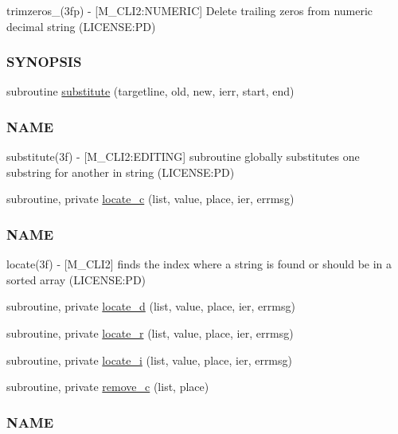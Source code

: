 \begin{DoxyCompactItemize}
\begin{DoxyCompactList}
trimzeros\+\_\+(3fp) -\/ \mbox{[}M\+\_\+\+C\+L\+I2\+:N\+U\+M\+E\+R\+IC\mbox{]} Delete trailing zeros from numeric decimal string (L\+I\+C\+E\+N\+SE\+:PD) \subsubsection*{S\+Y\+N\+O\+P\+S\+IS}\end{DoxyCompactList}\item 
subroutine \mbox{\hyperlink{namespacem__cli2_a76af7f7c39e6755e024890d85d488704}{substitute}} (targetline, old, new, ierr, start, end)
\begin{DoxyCompactList}\small\item\em \subsubsection*{N\+A\+ME}

substitute(3f) -\/ \mbox{[}M\+\_\+\+C\+L\+I2\+:E\+D\+I\+T\+I\+NG\mbox{]} subroutine globally substitutes one substring for another in string (L\+I\+C\+E\+N\+SE\+:PD) \end{DoxyCompactList}\item 
subroutine, private \mbox{\hyperlink{namespacem__cli2_a2199778fea512efcde8778f20765643a}{locate\+\_\+c}} (list, value, place, ier, errmsg)
\begin{DoxyCompactList}\small\item\em \subsubsection*{N\+A\+ME}

locate(3f) -\/ \mbox{[}M\+\_\+\+C\+L\+I2\mbox{]} finds the index where a string is found or should be in a sorted array (L\+I\+C\+E\+N\+SE\+:PD) \end{DoxyCompactList}\item 
subroutine, private \mbox{\hyperlink{namespacem__cli2_a0e859cd8635ab617ea9a4e9b4ffca852}{locate\+\_\+d}} (list, value, place, ier, errmsg)
\item 
subroutine, private \mbox{\hyperlink{namespacem__cli2_a2e12eb8c0ae6ce90b821141699e627df}{locate\+\_\+r}} (list, value, place, ier, errmsg)
\item 
subroutine, private \mbox{\hyperlink{namespacem__cli2_a3cc41a1a629f9ab278376a71b243673d}{locate\+\_\+i}} (list, value, place, ier, errmsg)
\item 
subroutine, private \mbox{\hyperlink{namespacem__cli2_a155af513c048d68552ec2e8fb54e1294}{remove\+\_\+c}} (list, place)
\begin{DoxyCompactList}\small\item\em \subsubsection*{N\+A\+ME}


\end{DoxyCompactList}
\end{DoxyCompactItemize}
